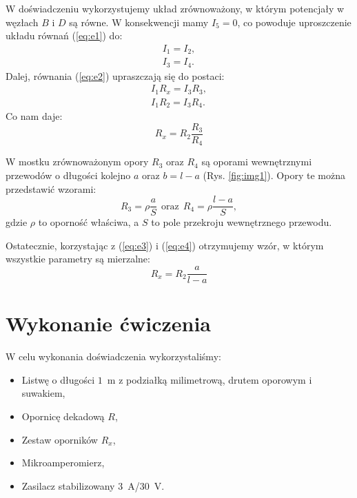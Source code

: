 \documentclass[12pt,a4paper]{article}
\numberwithin{equation}{section}
\begin{document}
W doświadczeniu wykorzystujemy układ zrównoważony, w którym potencjały w węzłach $B$ i $D$ są równe. W konsekwencji mamy $I_5 = 0$, co powoduje uproszczenie układu równań (\ref{eq:e1}) do:
\begin{equation}
	\begin{split}
	I_1 = I_2, \\
	I_3 = I_4.
	\end{split}
\end{equation}
Dalej, równania (\ref{eq:e2}) upraszczają się do postaci:
\begin{equation}
	\begin{split}
	I_1 R_x = I_3 R_3 , \\
	I_1 R_2 = I_3 R_4.
	\end{split}
\end{equation}
Co nam daje:
\begin{equation}
	R_x = R_2\frac{R_3}{R_4}
	\label{eq:e3}
\end{equation}

W mostku zrównoważonym opory $R_3$ oraz $R_4$ są oporami wewnętrznymi przewodów o długości kolejno $a$ oraz $b = l - a$ (Rys. \ref{fig:img1}). Opory te można przedstawić wzorami:
\begin{equation}
		R_3 = \rho\frac{a}{S}~~\textrm{oraz}~~R_4 = \rho \frac{l - a}{S},
		\label{eq:e4}
\end{equation}
gdzie $\rho$ to oporność właściwa, a $S$ to pole przekroju wewnętrznego przewodu.

Ostatecznie, korzystając z (\ref{eq:e3}) i (\ref{eq:e4}) otrzymujemy wzór, w którym wszystkie parametry są mierzalne:
\begin{equation}
	R_x = R_2 \frac{a}{l - a}
\end{equation}

\pagebreak
\section{Wykonanie ćwiczenia}


W celu wykonania doświadczenia wykorzystaliśmy:
\begin{itemize}
	\item Listwę o długości $1$~m z podziałką milimetrową, drutem oporowym i suwakiem,
	\item Opornicę dekadową $R$,
	\item Zestaw oporników $R_x$,
	\item Mikroamperomierz,
	\item Zasilacz stabilizowany $3$~A/$30$~V.
\end{itemize}
\end{document}
